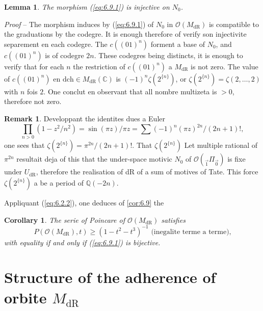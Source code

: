 \documentclass[11pt,a4paper]{article}
\theoremstyle{plain}
\newtheorem{lemma}[theorem]{Lemma}
\newtheorem{corollary}[theorem]{Corollary}
\theoremstyle{definition}
\newtheorem{remark}[theorem]{Remark}
\newcommand{\Q}{\mathbb{Q}}
\newcommand{\C}{\mathbb{C}}
\newcommand{\dR}{\mathrm{dR}}
\begin{document}
\begin{lemma}\label{lem:6.11}
The morphism (\ref{eq:6.9.1}) is injective on $N_0$.
\end{lemma}

\noindent \textit{Proof} -- The morphism induces by (\ref{eq:6.9.1}) of $N_0$ in $\mathcal{O}(M_{\dR})$ is compatible to the graduations by the codegre. It is enough therefore of verify son injectivite separement en each codegre. The $c((01)^n)$ forment a base of $N_0$, and $c((01)^n)$ is of codegre $2n$. These codegres being distincts, it is enough to verify that for each $n$ the restriction of $c((01)^n)$ a $M_{\dR}$ is not zero. The value of $c((01)^n)$ en $\mathrm{dch} \in M_{\dR}(\C)$ is $(-1)^n \zeta(2^{\{n\}})$, or $\zeta(2^{\{n\}}) = \zeta(2,\ldots,2)$ with $n$ fois $2$. One conclut en observant that all nombre multizeta is $> 0$, therefore not zero.

\begin{remark}\label{rem:6.12}
Developpant the identites dues a Euler
\[
\prod_{n>0} (1 - z^2/n^2) = \sin(\pi z)/\pi z = \sum (-1)^n (\pi z)^{2n}/(2n+1)!,
\]
one sees that $\zeta(2^{\{n\}}) = \pi^{2n}/(2n+1)!$. That $\zeta(2^{\{n\}})$ Let multiple rational of $\pi^{2n}$ resultait deja of this that the under-space motivic $N_0$ of $\mathcal{O}({}_{\vec{1}}\Pi_{\vec{0}})$ is fixe under $U_{\dR}$, therefore the realisation of dR of a sum of motives of Tate. This force $\zeta(2^{\{n\}})$ a be a period of $\Q(-2n)$.
\end{remark}

Appliquant (\ref{eq:6.2.2}), one deduces of \ref{cor:6.9} the

\begin{corollary}\label{cor:6.10}
The serie of Poincare of $\mathcal{O}(M_{\dR})$ satisfies
\begin{equation}\label{eq:6.10.1}
P(\mathcal{O}(M_{\dR}),t) \geq (1 - t^2 - t^3)^{-1} \text{ (inegalite terme a terme),}
\end{equation}
with equality if and only if (\ref{eq:6.9.1}) is bijective.
\end{corollary}

\section{Structure of the adherence of orbite $M_{\dR}$}\label{sec:7}

\subsection{}\label{ssec:7.1}
\end{document}
